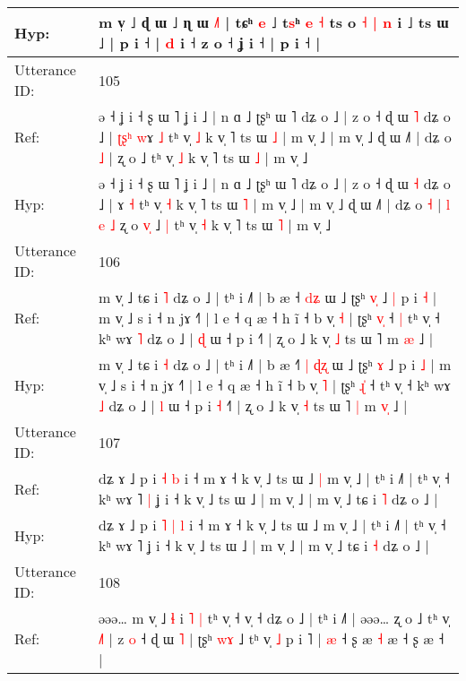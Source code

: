 \documentclass[10pt]{article}
\DeclareRobustCommand{\hl}[1]{{\textcolor{red}{#1}}}
\begin{document}
\begin{longtable}{ll}
 \\
Hyp: & m v̩ ˩ ɖ ɯ ˩ ɳ ɯ \hl{˩}˥ | tɕʰ \hl{e} ˩ t\hl{s}ʰ \hl{}\hl{e} \hl{˧} ts o\hl{ }\hl{˧} \hl{|} \hl{n} i ˩ ts ɯ ˩ | p i ˧ | \hl{d} i ˧ z o ˧ ʝ i ˧ | p i ˧ |
 \\
\midrule
Utterance ID: & 105 \\
Ref: & ə ˧ ʝ i ˧ ʂ ɯ ˥ ʝ i ˩ | n ɑ ˩ ʈʂʰ ɯ ˥ dʑ o ˩ | z o ˧ ɖ ɯ \hl{˥} dʑ o ˩ |\hl{ }\hl{ʈ}\hl{ʂ}\hl{ʰ} \hl{w}ɤ \hl{˩} tʰ v̩ \hl{˩} k v̩ ˥ ts ɯ \hl{˩} | m v̩ ˩ | m v̩ ˩ ɖ ɯ ˩˥ | dʑ o \hl{˩} |\hl{}\hl{}\hl{}\hl{}\hl{}\hl{} ʐ o\hl{}\hl{}\hl{} ˩\hl{}\hl{} tʰ v̩ \hl{˩} k v̩ ˥ ts ɯ \hl{˩} | m v̩ ˩
 \\
Hyp: & ə ˧ ʝ i ˧ ʂ ɯ ˥ ʝ i ˩ | n ɑ ˩ ʈʂʰ ɯ ˥ dʑ o ˩ | z o ˧ ɖ ɯ \hl{˧} dʑ o ˩ |\hl{}\hl{}\hl{}\hl{} \hl{}ɤ \hl{˧} tʰ v̩ \hl{˧} k v̩ ˥ ts ɯ \hl{˥} | m v̩ ˩ | m v̩ ˩ ɖ ɯ ˩˥ | dʑ o \hl{˧} |\hl{ }\hl{l}\hl{ }\hl{e}\hl{ }\hl{˩} ʐ o\hl{ }\hl{v}\hl{̩} ˩\hl{ }\hl{|} tʰ v̩ \hl{˧} k v̩ ˥ ts ɯ \hl{˥} | m v̩ ˩
 \\
\midrule
Utterance ID: & 106 \\
Ref: & m v̩ ˩ tɕ i \hl{˥} dʑ o ˩ | tʰ i ˩˥ | b æ ˧\hl{}\hl{}\hl{} \hl{d}\hl{ʑ} ɯ ˩ ʈʂʰ \hl{v}\hl{̩} ˩\hl{ }\hl{|} p i \hl{˧} | m v̩ ˩ s i ˧ n jɤ ˧˥ | l e ˧ q æ ˧ h ĩ ˧ b v̩ \hl{˧} | ʈʂʰ \hl{v}\hl{̩} ˧\hl{ }\hl{|} tʰ v̩ ˧ kʰ wɤ \hl{˥} dʑ o ˩ | \hl{ɖ} ɯ ˧ p i\hl{}\hl{} ˧˥ | ʐ o ˩ k v̩ \hl{˩} ts ɯ ˥\hl{}\hl{} m \hl{}\hl{æ} ˩ |
 \\
Hyp: & m v̩ ˩ tɕ i \hl{˧} dʑ o ˩ | tʰ i ˩˥ | b æ ˧\hl{˥}\hl{ }\hl{|} \hl{ɖ}\hl{ʐ} ɯ ˩ ʈʂʰ \hl{}\hl{ɤ} ˩\hl{}\hl{} p i \hl{˩} | m v̩ ˩ s i ˧ n jɤ ˧˥ | l e ˧ q æ ˧ h ĩ ˧ b v̩ \hl{˥} | ʈʂʰ \hl{ɻ}\hl{̍} ˧\hl{}\hl{} tʰ v̩ ˧ kʰ wɤ \hl{˩} dʑ o ˩ | \hl{l} ɯ ˧ p i\hl{ }\hl{˧} ˧˥ | ʐ o ˩ k v̩ \hl{˧} ts ɯ ˥\hl{ }\hl{|} m \hl{v}\hl{̩} ˩ |
 \\
\midrule
Utterance ID: & 107 \\
Ref: & dʑ ɤ ˩ p i\hl{}\hl{} \hl{˧} \hl{b} i ˧ m ɤ ˧ k v̩ ˩ ts ɯ ˩\hl{ }\hl{|} m v̩ ˩ | tʰ i ˩˥ | tʰ v̩ ˧ kʰ wɤ ˥\hl{ }\hl{|} ʝ i ˧ k v̩ ˩ ts ɯ ˩ | m v̩ ˩ | m v̩ ˩ tɕ i \hl{˥} dʑ o ˩ |
 \\
Hyp: & dʑ ɤ ˩ p i\hl{ }\hl{˥} \hl{|} \hl{l} i ˧ m ɤ ˧ k v̩ ˩ ts ɯ ˩\hl{}\hl{} m v̩ ˩ | tʰ i ˩˥ | tʰ v̩ ˧ kʰ wɤ ˥\hl{}\hl{} ʝ i ˧ k v̩ ˩ ts ɯ ˩ | m v̩ ˩ | m v̩ ˩ tɕ i \hl{˧} dʑ o ˩ |
 \\
\midrule
Utterance ID: & 108 \\
Ref: & əəə… m v̩ ˩ \hl{ɬ} i\hl{ }\hl{˥} \hl{|} tʰ v̩ ˧ v̩ ˧ dʑ o ˩ | tʰ i ˩˥ | əəə… ʐ o ˩ tʰ v̩ \hl{˩}\hl{˥} | z \hl{o} ˧ ɖ ɯ \hl{˥} | ʈʂʰ \hl{w}\hl{ɤ} ˩ tʰ v̩ \hl{˩} p i ˥ | \hl{æ} ˧ ʂ\hl{}\hl{}\hl{}\hl{} æ\hl{}\hl{} \hl{˧} æ ˧ ʂ æ ˧ |

\end{longtable}
\end{document}
